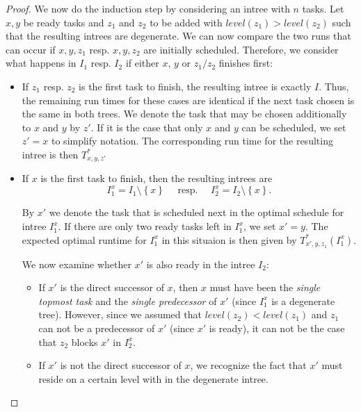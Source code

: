 \begin{proof}
  We now do the induction step by considering an intree with $n$ tasks. 
  Let $x,y$ be ready tasks and $z_1$ and $z_2$ to be added with $level(z_1) > level(z_2)$ such that the resulting intrees are degenerate.
  We can now compare the two runs that can occur if $x,y,z_1$ resp. $x,y,z_2$ are initially scheduled. 
  Therefore, we consider what happens in $I_1$ resp. $I_2$ if either $x$, $y$ or $z_1/z_2$ finishes first:

  \begin{itemize}
  \item If $z_1$ resp. $z_2$ is the first task to finish, the resulting intree is exactly $I$. Thus, the remaining run times for these cases are identical if the next task chosen is the same in both trees. We denote the task that may be chosen additionally to $x$ and $y$ by $z'$. If it is the case that only $x$ and $y$ can be scheduled, we set $z'=x$ to simplify notation. The corresponding run time for the resulting intree is then $T^*_{x,y,z'}$

  \item If $x$ is the first task to finish, then the resulting intrees are 
    \begin{equation*}
      I^x_{1}=I_1\setminus\left\{ x \right\} \quad \text{ resp. } \quad I^x_{2}=I_2\setminus\left\{ x \right\}.
    \end{equation*}

    By $x'$ we denote the task that is scheduled next in the optimal schedule for intree $I_1^x$. 
    If there are only two ready tasks left in $I_1^x$, we set $x'=y$. The expected optimal runtime for $I_1^x$ in this situaion is then given by $T_{x',y,z_1}^*(I_1^x)$.

    We now examine whether $x'$ is also ready in the intree $I_2$:
    \begin{itemize}
    \item If $x'$ is the direct successor of $x$, then $x$ must have been the \emph{single topmost task} and the \emph{single predecessor} of $x'$ (since $I_1^x$ is a degenerate tree). However, since we assumed that $level(z_2)<level(z_1)$ and $z_1$ can not be a predecessor of $x'$ (since $x'$ is ready), it can not be the case that $z_2$ blocks $x'$ in $I_2^x$.

    \item If $x'$ is not the direct successor of $x$, we recognize the fact that $x'$ must reside on a certain level with in the degenerate intree. 


\end{itemize}
\end{itemize}
\end{proof}
